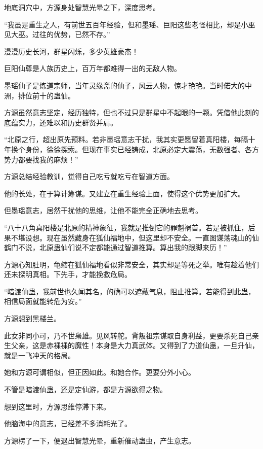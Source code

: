 
\begin{this_body}

地底洞穴中，方源身处智慧光晕之下，深度思考。

“我虽是重生之人，有前世五百年经验，但和墨瑶、巨阳这些老怪相比，却是小巫见大巫。过往的优势，已然不存。”

漫漫历史长河，群星闪烁，多少英雄豪杰！

巨阳仙尊是人族历史上，百万年都难得一出的无敌人物。

墨瑶仙子是炼道宗师，当年灵缘斋的仙子，风云人物，惊才艳艳。当时偌大的中洲，排位前十的蛊仙。

方源虽然意志坚定，经历独特，但也不过只是群星中不起眼的一颗。凭借他此刻的底蕴实力，还难以和历史群贤并肩。

“北原之行，超出原先预料。若非墨瑶意志干扰，我其实更愿留着真阳楼，每隔十年换个身份，徐徐探索。但现在事实已经铸成，北原必定大震荡，无数强者、各方势力都要找我的麻烦！”

方源总结经验教训，觉得自己吃亏就吃亏在智道方面。

他的长处，在于算计筹谋。又建立在重生经验上面，使得这个优势更加扩大。

但墨瑶意志，居然干扰他的思维，让他不能完全正确地去思考。

“八十八角真阳楼是北原的精神象征，我就是推倒它的罪魁祸首。若是被抓住，后果不堪设想。现在虽然藏身在狐仙福地中，但这里却不安全。一直图谋荡魂山的仙鹤门不说，北原蛊仙们说不定都能通过智道推算。算出我的跟脚来历！”

方源心知肚明，龟缩在狐仙福地看似非常安全，其实却是等死之举。唯有趁着他们还未探明真相。下先手，才能挽救危局。

“暗渡仙蛊，我前世也久闻其名，的确可以遮蔽气息，阻止推算。若能得到此蛊，相信局面就能转危为安。”

方源想到黑楼兰。

此女非同小可，乃不世枭雄。见风转舵。背叛祖宗谋取自身利益，更要杀死自己亲生父亲，这是赤裸裸的魔性！本身是大力真武体。又得到了力道仙蛊，一旦升仙，就是一飞冲天的格局。

她和方源可谓相似，但正因如此。和她合作。更要分外小心。

不管是暗渡仙蛊，还是定仙游，都是方源欲得之物。

想到这里时，方源思维停滞下来。

他脑海中的意志，已经差不多消耗光了。

方源楞了一下，便退出智慧光晕，重新催动蛊虫，产生意志。


\end{this_body}
